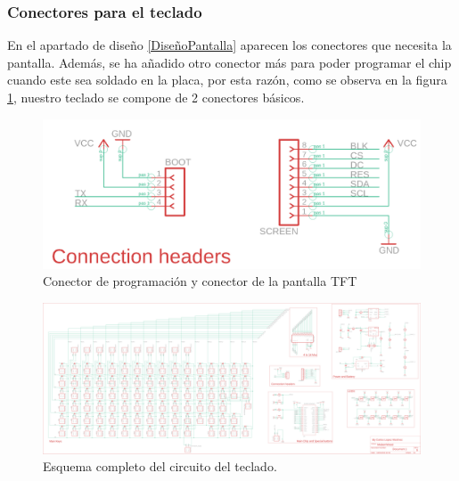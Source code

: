 \subsubsection{Conectores para el teclado}
En el apartado de diseño \ref{DiseñoPantalla} aparecen los conectores que necesita la pantalla. Además, se ha añadido otro conector más para poder programar el chip cuando este sea soldado en la placa, por esta razón, como se observa en la figura \ref{fig:CircuitoConectores}, nuestro teclado se compone de 2 conectores básicos.

\begin{figure}[H]
    \centering
    \includegraphics[width=1.0\textwidth]{imagenes/Capitulos/Cap04/Conectores.png}
    \caption{Conector de programación y conector de la pantalla \gls{TFT} \cite{Repo:ImagenCircuito}}
    \label{fig:CircuitoConectores}
\end{figure}

\begin{figure}
\centering
\includegraphics[width=\textheight]{imagenes/Capitulos/Cap04/Esquematico.png}
\caption{Esquema completo del circuito del teclado. \cite{Repo:ImagenCircuito}}
\label{fig:CircuitoCompleto}
\end{figure}